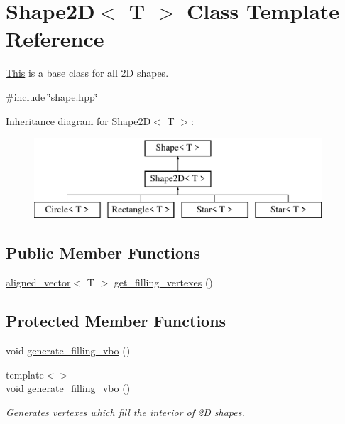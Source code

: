 \hypertarget{classShape2D}{}\section{Shape2D$<$ T $>$ Class Template Reference}
\label{classShape2D}


\mbox{\hyperlink{classThis}{This}} is a base class for all 2D shapes.  




{\ttfamily \#include \char`\"{}shape.\+hpp\char`\"{}}

Inheritance diagram for Shape2D$<$ T $>$\+:\begin{figure}[H]
\begin{center}
\leavevmode
\includegraphics[height=3.000000cm]{classShape2D}
\end{center}
\end{figure}
\subsection*{Public Member Functions}
\begin{DoxyCompactItemize}
\item 
\mbox{\hyperlink{type__definitions_8hpp_accb98a876f193a416d9c8a02fe22d526}{aligned\+\_\+vector}}$<$ T $>$ \mbox{\hyperlink{classShape2D_af67c7aed6e58b5aa0e3518a3ad1de75b}{get\+\_\+filling\+\_\+vertexes}} ()
\end{DoxyCompactItemize}
\subsection*{Protected Member Functions}
\begin{DoxyCompactItemize}
\item 
void \mbox{\hyperlink{classShape2D_a210e702aa5918b88f25fb6b63a911fc8}{generate\+\_\+filling\+\_\+vbo}} ()
\item 
{\footnotesize template$<$$>$ }\\void \mbox{\hyperlink{classShape2D_a328d401b8f1962078e904d4b1003d7a5}{generate\+\_\+filling\+\_\+vbo}} ()
\begin{DoxyCompactList}\small\item\em Generates vertexes which fill the interior of 2D shapes. \end{DoxyCompactList}\end{DoxyCompactItemize}
